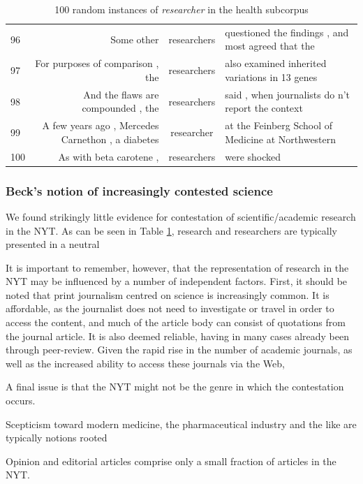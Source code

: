 {\begin{table}
\begin{tabular}{|lrcl|}
96 &  Some other                                         & researchers & questioned the findings , and most agreed that the \\
97 &  For purposes of comparison , the                   & researchers & also examined inherited variations in 13 genes     \\
98 &  And the flaws are compounded , the                 & researchers & said , when journalists do n't report the context  \\
99 &  A few years ago , Mercedes Carnethon , a diabetes  & researcher  & at the Feinberg School of Medicine at Northwestern \\
100 &  As with beta carotene ,                            & researchers & were shocked                                       \\
\hline
\end{tabular}
\caption{100 random instances of \emph{researcher} in the health subcorpus}
\label{tab:research}
\end{table}
\clearpage
}

\subsubsection{Beck's notion of increasingly contested science}

We found strikingly little evidence for contestation of scientific\slash academic research in the NYT. As can be seen in Table \ref{tab:research}, research and researchers are typically presented in a neutral

It is important to remember, however, that the representation of research in the NYT may be influenced by a number of independent factors. First, it should be noted that print journalism centred on science is increasingly common. It is affordable, as the journalist does not need to investigate or travel in order to access the content, and much of the article body can consist of quotations from the journal article. It is also deemed reliable, having in many cases already been through peer-review. Given the rapid rise in the number of academic journals, as well as the increased ability to access these journals via the Web, 

A final issue is that the NYT might not be the genre in which the contestation occurs.

Scepticism toward modern medicine, the pharmaceutical industry and the like are typically notions rooted 

Opinion and editorial articles comprise only a small fraction of articles in the NYT.


